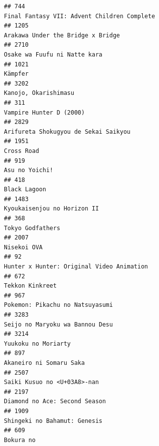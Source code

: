 \documentclass[
]{article}
\begin{document}
\begin{verbatim}
## 744                                                                Final Fantasy VII: Advent Children Complete
## 1205                                                                         Arakawa Under the Bridge x Bridge
## 2710                                                                              Osake wa Fuufu ni Natte kara
## 1021                                                                                                   Kämpfer
## 3202                                                                                      Kanojo, Okarishimasu
## 311                                                                                    Vampire Hunter D (2000)
## 2829                                                                      Arifureta Shokugyou de Sekai Saikyou
## 1951                                                                                                Cross Road
## 919                                                                                             Asu no Yoichi!
## 418                                                                                               Black Lagoon
## 1483                                                                               Kyoukaisenjou no Horizon II
## 368                                                                                           Tokyo Godfathers
## 2007                                                                                               Nisekoi OVA
## 92                                                                   Hunter x Hunter: Original Video Animation
## 672                                                                                            Tekkon Kinkreet
## 967                                                                            Pokemon: Pikachu no Natsuyasumi
## 3283                                                                           Seijo no Maryoku wa Bannou Desu
## 3214                                                                                       Yuukoku no Moriarty
## 897                                                                                    Akaneiro ni Somaru Saka
## 2507                                                                               Saiki Kusuo no <U+03A8>-nan
## 2197                                                                             Diamond no Ace: Second Season
## 1909                                                                              Shingeki no Bahamut: Genesis
## 609                                                                                                  Bokura no

\end{verbatim}
\end{document}
